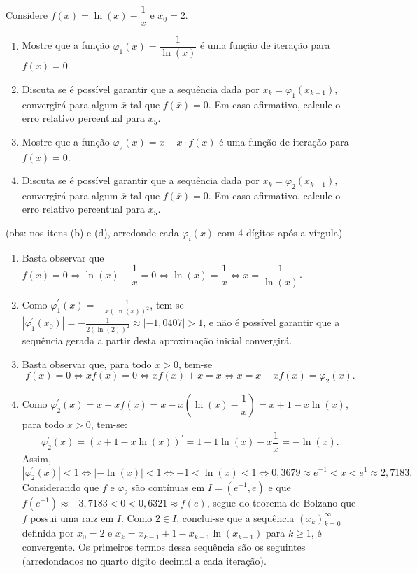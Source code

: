 \documentclass[12pt,a4paper]{article}
\begin{document}
\begin{ExerciseList}
\Exercise[title={2,5}] Considere $f(x) = \ln(x) - \dfrac{1}{x}$ e $x_0 = 2$.
\begin{enumerate}
\item Mostre que a função $\varphi_1(x) = \dfrac{1}{\ln(x)}$ é uma função de iteração para $f(x) = 0$.
\item Discuta se é possível garantir que a sequência dada por $x_k = \varphi_1(x_{k-1})$, convergirá para algum $\overline{x}$ tal que $f(\overline{x}) = 0$. Em caso afirmativo, calcule o erro relativo percentual para $x_5$.
\item Mostre que a função $\varphi_2(x) = x - x \cdot f(x)$ é uma função de iteração para $f(x) = 0$.
\item Discuta se é possível garantir que a sequência dada por $x_k = \varphi_2(x_{k-1})$, convergirá para algum $\overline{x}$ tal que $f(\overline{x}) = 0$. Em caso afirmativo, calcule o erro relativo percentual para $x_5$.
\end{enumerate}
(obs: nos itens (b) e (d), arredonde cada $\varphi_i(x)$ com 4 dígitos após a vírgula)
\Answer

\begin{enumerate}
\item Basta observar que $
f(x) = 0
\Leftrightarrow
\ln(x) - \dfrac{1}{x} = 0
\Leftrightarrow
\ln(x) = \dfrac{1}{x} 
\Leftrightarrow
x = \dfrac{1}{\ln(x)}$.

\item Como $\varphi_1^\prime(x) = -\frac{1}{x (\ln(x))^2}$, tem-se $|\varphi_1^\prime(x_0)| = -\frac{1}{2 (\ln(2))^2} \approx |-1,0407| > 1$, e não é possível garantir que a sequência gerada a partir desta aproximação inicial convergirá.

\item Basta observar que, para todo $x > 0$, tem-se
\[
f(x) = 0
\Leftrightarrow
x f(x) = 0
\Leftrightarrow
x f(x) + x = x
\Leftrightarrow
x = x - x f(x) = \varphi_2(x).
\]

\item Como $\varphi_2^\prime(x) = x - x f(x) = x - x\left(\ln(x) - \dfrac{1}{x}\right) = x+1-x\ln(x)$, para todo $x>0$, tem-se:
\[
\varphi_2^\prime(x)
= (x+1-x\ln(x))^\prime
= 1-1\ln(x)-x\frac{1}{x}
= -\ln(x).
\]
Assim,
\[
|\varphi_2^\prime(x)| < 1
\Leftrightarrow
|-\ln(x)| < 1
\Leftrightarrow
-1 < \ln(x) < 1
\Leftrightarrow
0,3679 \approx e^{-1} < x < e^1 \approx 2,7183.
\]
Considerando que $f$ e $\varphi_2$ são contínuas em $I = (e^{-1}, e )$ e que $f(e^{-1}) \approx -3,7183 < 0 < 0,6321 \approx f(e)$, segue do teorema de Bolzano que $f$ possui uma raiz em $I$. Como $2 \in I$, conclui-se que a sequência $(x_k)_{k=0}^\infty$ definida por $x_0 = 2$ e $x_k = x_{k-1}+1-x_{k-1}\ln(x_{k-1})$ para $k \geq 1$, é convergente. Os primeiros termos dessa sequência são os seguintes (arredondados no quarto dígito decimal a cada iteração).


\end{enumerate}
\end{ExerciseList}
\end{document}
